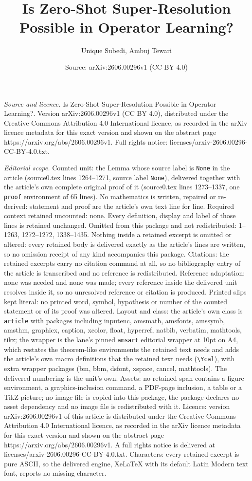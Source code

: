 \documentclass[10pt,a4paper]{amsart}
\title[Is Zero-Shot Super-Resolution Possible in Operator Learning?]{Is Zero-Shot Super-Resolution Possible in Operator Learning?}
\author{Unique Subedi, Ambuj Tewari}
\date{Source: arXiv:2606.00296v1 (CC BY 4.0)}
\begin{document}
\maketitle

\noindent\emph{Source and licence.} Is Zero-Shot Super-Resolution Possible in Operator Learning?. Version arXiv:2606.00296v1 (CC BY 4.0), distributed under the Creative Commons Attribution 4.0 International licence, as recorded in the arXiv licence metadata for this exact version and shown on the abstract page https://arxiv.org/abs/2606.00296v1. Full rights notice: licenses/arxiv-2606.00296-CC-BY-4.0.txt.\par\smallskip

\noindent\textit{Editorial scope.} Counted unit: the Lemma whose source label is \texttt{None} in the article (source0.tex lines 1264--1271, source label \texttt{None}), delivered together with the article's own complete original proof of it (source0.tex lines 1273--1337, one \texttt{proof} environment of 65 lines). No mathematics is written, repaired or re-derived: statement and proof are the article's own text line for line. Required context retained uncounted: none. Every definition, display and label of those lines is retained unchanged. Omitted from this package and not redistributed: 1--1263, 1272--1272, 1338--1435. Nothing inside a retained excerpt is omitted or altered: every retained body is delivered exactly as the article's lines are written, so no omission receipt of any kind accompanies this package. Citations: the retained excerpts carry no citation command at all, so no bibliography entry of the article is transcribed and no reference is redistributed. Reference adaptation: none was needed and none was made; every reference inside the delivered unit resolves inside it, so no unresolved reference or citation is produced. Printed slips kept literal: no printed word, symbol, hypothesis or number of the counted statement or of its proof was altered. Layout and class: the article's own class is \texttt{article} with packages including inputenc, amsmath, amsfonts, amssymb, amsthm, graphicx, caption, xcolor, float, hyperref, natbib, verbatim, mathtools, tikz; the wrapper is the lane's pinned \texttt{amsart} editorial wrapper at 10pt on A4, which restates the theorem-like environments the retained text needs and adds the article's own macro definitions that the retained text needs (\texttt{\textbackslash Ycal}), with extra wrapper packages (bm, bbm, dsfont, xspace, cancel, mathtools). The delivered numbering is the unit's own. Assets: no retained span contains a figure environment, a graphics-inclusion command, a PDF-page inclusion, a table or a TikZ picture; no image file is copied into this package, the package declares no asset dependency and no image file is redistributed with it. Licence: version arXiv:2606.00296v1 of this article is distributed under the Creative Commons Attribution 4.0 International licence, as recorded in the arXiv licence metadata for this exact version and shown on the abstract page https://arxiv.org/abs/2606.00296v1. A full rights notice is delivered at licenses/arxiv-2606.00296-CC-BY-4.0.txt. Characters: every retained excerpt is pure ASCII, so the delivered engine, XeLaTeX with its default Latin Modern text font, reports no missing character.
\end{document}
